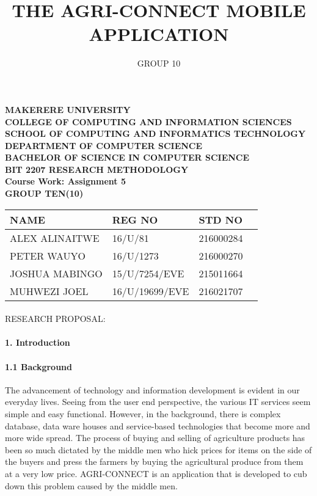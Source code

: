 \documentclass[10pt,a4paper]{report}
\author{GROUP 10}
\title{THE AGRI-CONNECT MOBILE APPLICATION}
\begin{document}
\begin{Huge}
\begin{center}
\begin{normalsize}
\textbf{MAKERERE UNIVERSITY }\\
\textbf{COLLEGE OF COMPUTING AND INFORMATION SCIENCES} \\
\textbf{SCHOOL OF COMPUTING AND INFORMATICS TECHNOLOGY} \\
\textbf{DEPARTMENT OF COMPUTER SCIENCE} \\
\textbf{BACHELOR OF SCIENCE IN COMPUTER SCIENCE} \\
\textbf{BIT 2207 RESEARCH METHODOLOGY} \\
\textbf{Course Work: Assignment 5}\\
\textbf{GROUP TEN(10)}
\end{normalsize}
\end{center}
\end{Huge}

\begin{center}
\begin{tabular}{|l|l|l|c|}
\hline NAME  & REG NO & STD NO \\\hline
ALEX ALINAITWE & 16/U/81 & 216000284 \\\hline
PETER WAUYO & 16/U/1273 & 216000270 \\\hline
JOSHUA MABINGO & 15/U/7254/EVE & 215011664 \\\hline
MUHWEZI JOEL & 16/U/19699/EVE & 216021707 \\\hline
\end{tabular}

\paragraph{}
RESEARCH PROPOSAL:
\end{center}

\newpage
\maketitle


\paragraph{1.  Introduction}
\paragraph{1.1  Background}
\begin{flushleft}
The advancement of technology and information development is evident in our everyday lives. Seeing from the user end perspective, the various IT services seem simple and easy functional. However, in the background, there is complex database, data ware houses and service-based technologies that become more and more wide spread. The process of buying and selling of agriculture products has been so much dictated by the middle men who hick prices for items on the side of the buyers and press the farmers by buying the agricultural produce from them at a very low price. AGRI-CONNECT is an application that is developed to cub down this problem caused by the middle men.
\end{flushleft}
\end{document}
